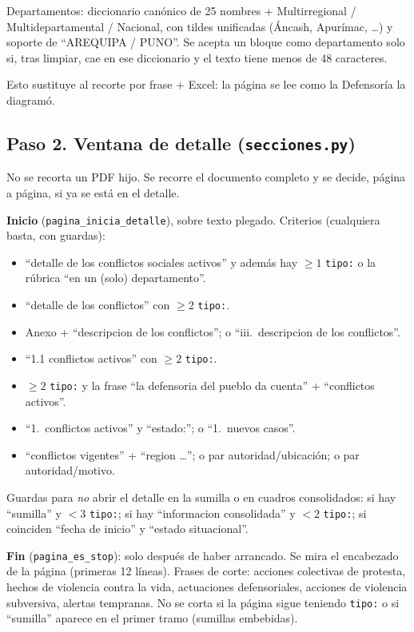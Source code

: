 \documentclass[11pt,a4paper]{article}
\begin{document}
Departamentos: diccionario canónico de 25 nombres + Multirregional / Multidepartamental / Nacional, con tildes unificadas (Áncash, Apurímac, \ldots) y soporte de ``AREQUIPA / PUNO''. Se acepta un bloque como departamento solo si, tras limpiar, cae en ese diccionario y el texto tiene menos de 48 caracteres.

Esto sustituye al recorte por frase + Excel: la página se lee como la Defensoría la diagramó.

\subsection{Paso 2. Ventana de detalle (\texttt{secciones.py})}

No se recorta un PDF hijo. Se recorre el documento completo y se decide, página a página, si ya se está en el detalle.

\textbf{Inicio} (\texttt{pagina\_inicia\_detalle}), sobre texto plegado. Criterios (cualquiera basta, con guardas):

\begin{itemize}
  \item ``detalle de los conflictos sociales activos'' y además hay $\ge 1$ \texttt{tipo:} o la rúbrica ``en un (solo) departamento''.
  \item ``detalle de los conflictos'' con $\ge 2$ \texttt{tipo:}.
  \item Anexo + ``descripcion de los conflictos''; o ``iii.\ descripcion de los conflictos''.
  \item ``1.1 conflictos activos'' con $\ge 2$ \texttt{tipo:}.
  \item $\ge 2$ \texttt{tipo:} y la frase ``la defensoria del pueblo da cuenta'' + ``conflictos activos''.
  \item ``1.\ conflictos activos'' y ``estado:''; o ``1.\ nuevos casos''.
  \item ``conflictos vigentes'' + ``region \ldots''; o par autoridad/ubicación; o par autoridad/motivo.
\end{itemize}

Guardas para \emph{no} abrir el detalle en la sumilla o en cuadros consolidados: si hay ``sumilla'' y $<3$ \texttt{tipo:}; si hay ``informacion consolidada'' y $<2$ \texttt{tipo:}; si coinciden ``fecha de inicio'' y ``estado situacional''.

\textbf{Fin} (\texttt{pagina\_es\_stop}): solo después de haber arrancado. Se mira el encabezado de la página (primeras 12 líneas). Frases de corte: acciones colectivas de protesta, hechos de violencia contra la vida, actuaciones defensoriales, acciones de violencia subversiva, alertas tempranas. No se corta si la página sigue teniendo \texttt{tipo:} o si ``sumilla'' aparece en el primer tramo (sumillas embebidas).
\end{document}
